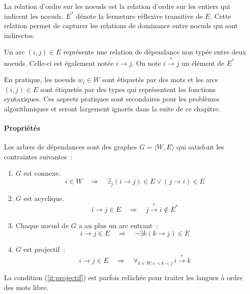 \documentclass[11pt,openany]{book}
\begin{document}
La relation d'ordre sur les noeuds est la relation d'ordre sur les
entiers qui indicent les noeuds.
$E^*$ dénote la fermeture réflexive transitive de $E$. Cette relation
permet de capturer les relations de dominance entre noeuds qui sont indirectes.

Un arc $(i,j) \in E$ représente une relation de dépendance non typée entre
deux noeuds. Celle-ci est
également notée $i \rightarrow j$. 
On note $i\stackrel{*}{\rightarrow} j$ un élément de $E^*$

En pratique, les noeuds $w_i \in W$ sont étiquetés par des mots et les
arcs $(i,j) \in E$ sont étiquetés par des types qui représentent les
fonctions syntaxiques. Ces aspects pratiques sont secondaires pour les
problèmes algorithmiques et seront largement ignorés dans la suite de ce chapitre.


\paragraph{Propriétés}
Les arbres de dépendances sont des graphes $G = \langle W,E \rangle$ qui satisfont les
contraintes suivantes~:
\begin{enumerate}
\item $G$ est connexe. 
\begin{displaymath}
 i\in W \quad\Rightarrow\quad \exists_j (i \rightarrow j) \in E \lor
  (j\rightarrow i) \in E
\end{displaymath}
\item $G$ est acyclique. 
\begin{displaymath}
i \rightarrow j\in E \quad\Rightarrow\quad 
  j \stackrel{*}{\rightarrow} i \not \in E^*
\end{displaymath}
\item Chaque  noeud de $G$  a au plus un arc entrant~: 
\begin{displaymath}
i\rightarrow j  \in E \quad\Rightarrow\quad \lnot \exists k  (k\rightarrow j)\in E
\end{displaymath}
\item\label{it:projectif} $G$ est projectif~: 
\begin{displaymath}
 i\rightarrow j \in E \quad\Rightarrow\quad 
\forall_{k\in W: i
\prec k \prec j}  \, i\stackrel{*}{\rightarrow} k 
\end{displaymath}
\end{enumerate}
La condition (\ref{it:projectif}) est parfois relâchée pour traiter
les langues à ordre des mots libre.
\end{document}
